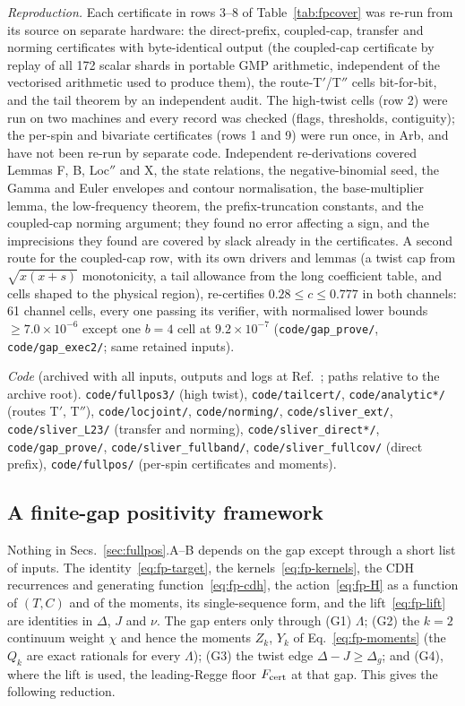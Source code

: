 \emph{Reproduction.} Each certificate in rows 3--8 of Table~\ref{tab:fpcover} was re-run from its source on separate hardware: the
direct-prefix, coupled-cap, transfer and norming certificates with byte-identical output (the coupled-cap certificate by replay of all
172 scalar shards in portable GMP arithmetic, independent of the vectorised arithmetic used to produce them), the route-T$'$/T$''$ cells bit-for-bit, and the tail theorem by an independent audit. The high-twist cells (row 2) were run on
two machines and every record was checked (flags, thresholds, contiguity); the per-spin and bivariate certificates (rows 1 and 9) were
run once, in Arb, and have not been re-run by separate code. Independent re-derivations covered Lemmas F, B, Loc$''$ and X, the state relations,
the negative-binomial seed, the Gamma and Euler envelopes and contour normalisation, the base-multiplier lemma, the low-frequency
theorem, the prefix-truncation constants, and the coupled-cap norming argument; they found no error affecting a sign, and the imprecisions they found are covered by slack already in the certificates. A second
route for the coupled-cap row, with its own drivers and lemmas (a twist cap from $\sqrt{x(x+s)}$ monotonicity, a tail allowance from the
long coefficient table, and cells shaped to the physical region), re-certifies $0.28\le c\le0.777$ in both channels: 61 channel
cells, every one passing its verifier, with normalised lower bounds $\ge7.0\times10^{-6}$ except one $b=4$ cell at $9.2\times10^{-7}$
(\texttt{code/gap\_prove/}, \texttt{code/gap\_exec2/}; same retained inputs).

{\sloppy \emph{Code} (archived with all inputs, outputs and logs at Ref.~\cite{Zenodo}; paths relative to the archive root). \texttt{code/fullpos3/} (high twist), \texttt{code/tailcert/}, \texttt{code/analytic*/} (routes T$'$, T$''$),
\texttt{code/locjoint/}, \texttt{code/norming/}, \texttt{code/sliver\_ext/}, \texttt{code/sliver\_L23/} (transfer and norming),
\texttt{code/sliver\_direct*/}, \texttt{code/gap\_prove/}, \texttt{code/sliver\_fullband/}, \texttt{code/sliver\_fullcov/} (direct prefix),
\texttt{code/fullpos/} (per-spin certificates and moments).\par}

\subsection{A finite-gap positivity framework}
\label{sec:fpframe}
Nothing in Secs.~\ref{sec:fullpos}.A--B depends on the gap except through a short list of inputs. The identity~\eqref{eq:fp-target},
the kernels~\eqref{eq:fp-kernels}, the CDH recurrences and generating function~\eqref{eq:fp-cdh}, the action~\eqref{eq:fp-H} as a
function of $(T,C)$ and of the moments, its single-sequence form, and the lift~\eqref{eq:fp-lift} are identities in $\Delta$, $J$
and $\nu$. The gap enters only through (G1) $\Lambda$; (G2) the $k=2$ continuum weight $\chi$ and hence the moments $Z_k$, $Y_k$
of Eq.~\eqref{eq:fp-moments} (the $Q_k$ are exact rationals for every $\Lambda$); (G3) the twist edge $\Delta-J\ge\Delta_g$; and
(G4), where the lift is used, the leading-Regge floor $F_{\rm cert}$ at that gap. This gives the following reduction.

